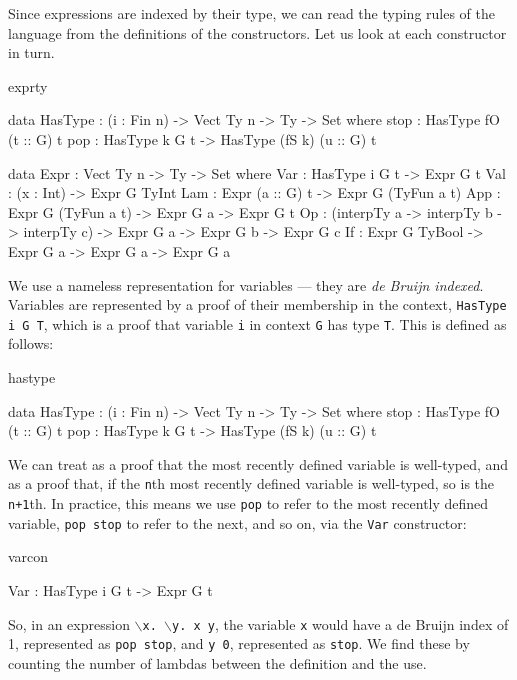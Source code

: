 \noindent
Since expressions are indexed by their type, we can read the typing rules of
the language from the definitions of the constructors. Let us look at each
constructor in turn.

\begin{SaveVerbatim}{exprty}

data HasType : (i : Fin n) -> Vect Ty n -> Ty -> Set where
    stop : HasType fO (t :: G) t
    pop  : HasType k G t -> HasType (fS k) (u :: G) t

data Expr : Vect Ty n -> Ty -> Set where
    Var : HasType i G t -> Expr G t
    Val : (x : Int) -> Expr G TyInt
    Lam : Expr (a :: G) t -> Expr G (TyFun a t)
    App : Expr G (TyFun a t) -> Expr G a -> Expr G t
    Op  : (interpTy a -> interpTy b -> interpTy c) -> Expr G a -> Expr G b -> 
          Expr G c
    If  : Expr G TyBool -> Expr G a -> Expr G a -> Expr G a
  
\end{SaveVerbatim}

\noindent
We use a nameless representation for variables --- they are \emph{de Bruijn indexed}.
Variables are represented by a proof of their membership in the context, 
\texttt{HasType i G T}, which is a proof that variable \texttt{i} in context 
\texttt{G} has type \texttt{T}. This is defined as follows:

\begin{SaveVerbatim}{hastype}

data HasType : (i : Fin n) -> Vect Ty n -> Ty -> Set where
    stop : HasType fO (t :: G) t
    pop  : HasType k G t -> HasType (fS k) (u :: G) t

\end{SaveVerbatim}

\noindent
We can treat  as a proof that the most recently defined variable is well-typed,
and  as a proof that, if the \texttt{n}th most recently defined variable is
well-typed, so is the \texttt{n+1}th. In practice, this means we use \texttt{pop} to
refer to the most recently defined variable, \texttt{pop stop} to refer to the next, and so on,
via the \texttt{Var} constructor:

\begin{SaveVerbatim}{varcon}

Var : HasType i G t -> Expr G t

\end{SaveVerbatim}

\noindent
So, in an expression \texttt{$\backslash$x. $\backslash$y. x y}, 
the variable \texttt{x} would have a de Bruijn index
of 1, represented as \texttt{pop stop}, and \texttt{y 0}, represented
as \texttt{stop}. We find these by counting the number of lambdas between the
definition and the use.

